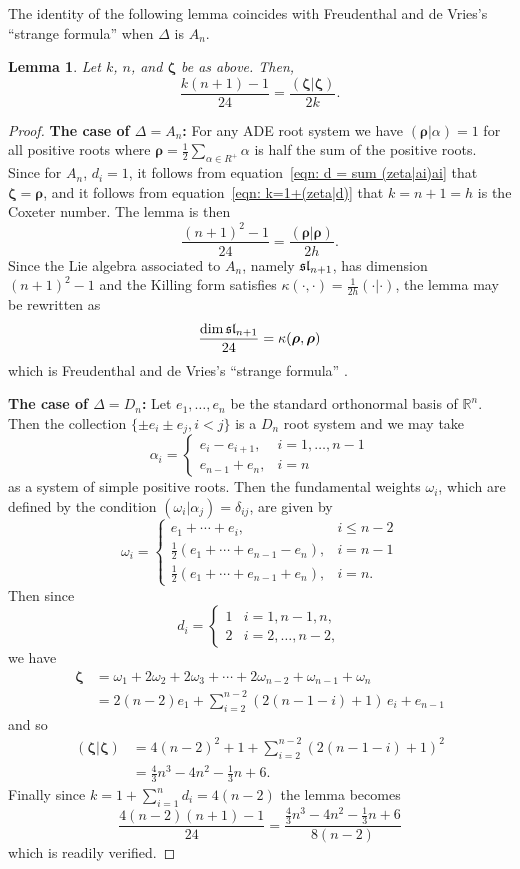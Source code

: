 \documentclass{article}
\newtheorem{lemma}[theorem]{Lemma}
\theoremstyle{definition}
\newcommand{\half}{\frac{1}{2}}
\newcommand{\RR} {{\mathbb R}}		%
\newcommand{\zetavec}{\bm{\zeta }}
\newcommand{\rhovec}{\bm{\rho }}
\begin{document}
The identity of the following lemma coincides with Freudenthal and de Vries's
``strange formula'' when $\Delta$ is $A_{n}$. 
\begin{lemma}\label{lem: another strange formula}
Let $k$, $n$, and $\zetavec$ be as above. Then,
\[
\frac{k(n+1)-1}{24} =\frac{(\zetavec |\zetavec )}{2k} . 
\]
\end{lemma}
\begin{proof}
\textbf{The case of $\Delta =A_{n}$:}
For any ADE root system we have $(\rhovec |\alpha )=1$ for all positive
roots where $\rhovec =\half \sum_{\alpha \in R^{+}}\alpha$ is half the
sum of the positive roots. Since for $A_{n}$, $d_{i}=1$, it follows
from equation~\eqref{eqn: d = sum (zeta|ai)ai} that $\zetavec
=\rhovec$, and it follows from equation~\eqref{eqn: k=1+(zeta|d)}
that $k=n+1=h$ is the Coxeter number. The lemma is then
\[
\frac{(n+1)^{2}-1}{24} = \frac{(\rhovec |\rhovec )}{2h}.
\]
Since the Lie algebra associated to $A_{n}$, namely $\frak{sl}_{n+1}$,
has dimension $(n+1)^{2}-1$ and the Killing form satisfies $\kappa
(\cdot ,\cdot )=\frac{1}{2h}(\cdot |\cdot )$, the lemma may be
rewritten as
\[
\frac{\dim \frak{sl}_{n+1}}{24} =\kappa (\rhovec ,\rhovec )
\]
which is Freudenthal and de Vries's ``strange formula''
\cite[47.11]{freudenthal1969linear}.

\bigskip
\textbf{The case of $\Delta =D_{n}$:} Let $e_{1},\dotsc ,e_{n}$ be the
standard orthonormal basis of $\RR^{n}$. Then the collection $\{\pm
e_{i} \pm e_{j}, i<j \}$ is a $D_{n}$ root system and we may take 
\[
\alpha_{i} = \begin{cases}
e_{i}-e_{i+1},& i=1,\dotsc ,n-1\\
e_{n-1}+e_{n},&i=n
\end{cases}
\]
as a system of simple positive roots. Then the fundamental weights
$\omega_{i}$, which are defined by the condition $(\omega_{i}
|\alpha_{j}) = \delta_{ij} $, are given by \cite[Appendix C]{Knapp}
\[
\omega_{i} = \begin{cases}
e_{1}+\dotsb +e_{i},& i\leq n-2\\
\half (e_{1}+\dotsb +e_{n-1}-e_{n}),& i=n-1\\
\half (e_{1}+\dotsb +e_{n-1}+e_{n}),& i=n.
\end{cases}
\]
Then since
\[
d_{i}=\begin{cases}
1&i=1,n-1,n,\\
2&i=2,\dotsc , n-2,
\end{cases}
\]
we have
\begin{align*}
\zetavec & = \omega_{1}+2\omega_{2}+2\omega_{3}+\dotsb +2\omega_{n-2}+\omega_{n-1}+\omega_{n}\\
&= 2(n-2) e_{1} + \sum_{i=2}^{n-2}\left(2(n-1-i)+1 \right)\, e_{i}  +e_{n-1}
\end{align*}
and so
\begin{align*}
(\zetavec |\zetavec ) &= 4(n-2)^{2} + 1 + \sum_{i=2}^{n-2} \left(2(n-1-i)+1 \right)^{2}\\
&= \frac{4}{3}n^{3}-4n^{2}-\frac{1}{3}n+6.
\end{align*}
Finally since $k=1+\sum_{i=1}^{n}d_{i} = 4(n-2)$ the lemma becomes
\[
\frac{4(n-2)(n+1)-1}{24} = \frac{ \frac{4}{3}n^{3}-4n^{2}-\frac{1}{3}n+6}{8(n-2)}
\]
which is readily verified.


\end{proof}
\end{document}
